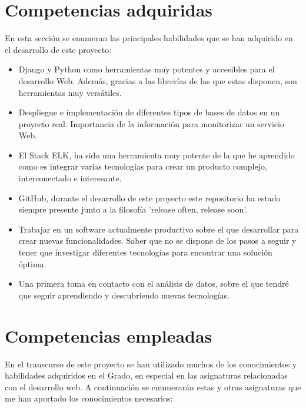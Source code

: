 \documentclass[11pt,a4paper]{book}
\begin{document}
		\section{Competencias adquiridas}
			En esta sección se enumeran las principales habilidades que se han adquirido en el desarrollo de este proyecto:
			\begin{itemize}
				\item Django y Python como herramientas muy potentes y accesibles para el desarrollo Web. Además, gracias a las librerías de las que estas disponen, son herramientas muy versátiles.\\
				
				\item Despliegue e implementación de diferentes tipos de bases de datos en un proyecto real. Importancia de la información para monitorizar un servicio Web.\\
				
				\item El Stack ELK, ha sido una herramienta muy potente de la que he aprendido como es integrar varias tecnologías para crear un producto complejo, interconectado e interesante.\\
				
				\item GitHub, durante el desarrollo de este proyecto este repositorio ha estado siempre presente junto a la filosofía 'release often, release soon'.\\
				
				\item Trabajar en un software actualmente productivo sobre el que desarrollar para crear nuevas funcionalidades. Saber que no se dispone de los pasos a seguir y tener que investigar diferentes tecnologías para encontrar una solución óptima.\\
				 
				\item Una primera toma en contacto con el análisis de datos, sobre el que tendré que seguir aprendiendo y descubriendo nuevas tecnologías.\\
			\end{itemize}
			
		\section{Competencias empleadas}
			En el transcurso de este proyecto se han utilizado muchos de los conocimientos y habilidades adquiridos en el Grado, en especial en las asignaturas relacionadas con el desarrollo web. A continuación se enumerarán estas y otras asignaturas que me han aportado los conocimientos necesarios:
			
\end{document}
